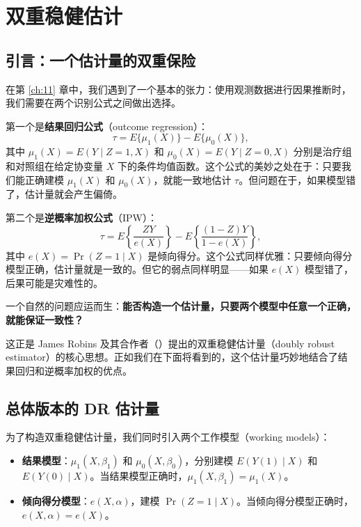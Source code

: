 
\chapter{双重稳健估计}\label{ch:12}

\section{引言：一个估计量的双重保险}\label{sec:12-intro}

在第 \ref{ch:11} 章中，我们遇到了一个基本的张力：使用观测数据进行因果推断时，我们需要在两个识别公式之间做出选择。

第一个是\textbf{结果回归公式}（outcome regression）：
\[
\tau = E\{\mu_1(X)\} - E\{\mu_0(X)\},
\label{eq:12-outcome-reg}
\]
其中 $\mu_1(X) = E(Y \mid Z=1, X)$ 和 $\mu_0(X) = E(Y \mid Z=0, X)$ 分别是治疗组和对照组在给定协变量 $X$ 下的条件均值函数。这个公式的美妙之处在于：只要我们能正确建模 $\mu_1(X)$ 和 $\mu_0(X)$，就能一致地估计 $\tau$。但问题在于，如果模型错了，估计量就会产生偏倚。

第二个是\textbf{逆概率加权公式}（IPW）：
\[
\tau = E\left\{\frac{ZY}{e(X)}\right\} - E\left\{\frac{(1-Z)Y}{1-e(X)}\right\},
\label{eq:12-ipw}
\]
其中 $e(X) = \Pr(Z=1 \mid X)$ 是倾向得分。这个公式同样优雅：只要倾向得分模型正确，估计量就是一致的。但它的弱点同样明显——如果 $e(X)$ 模型错了，后果可能是灾难性的。

一个自然的问题应运而生：\textbf{能否构造一个估计量，只要两个模型中任意一个正确，就能保证一致性？}

这正是 James Robins 及其合作者（\citealp{Scharfstein:1999, BangRobins:2005}）提出的双重稳健估计量（doubly robust estimator）的核心思想。正如我们在下面将看到的，这个估计量巧妙地结合了结果回归和逆概率加权的优点。

\section{总体版本的 DR 估计量}\label{sec:12-population}

为了构造双重稳健估计量，我们同时引入两个工作模型（working models）：
\begin{itemize}
  \item \textbf{结果模型}：$\mu_1(X, \beta_1)$ 和 $\mu_0(X, \beta_0)$，分别建模 $E(Y(1) \mid X)$ 和 $E(Y(0) \mid X)$。当结果模型正确时，$\mu_1(X, \beta_1) = \mu_1(X)$。
  \item \textbf{倾向得分模型}：$e(X, \alpha)$，建模 $\Pr(Z=1 \mid X)$。当倾向得分模型正确时，$e(X, \alpha) = e(X)$。
\end{itemize}

